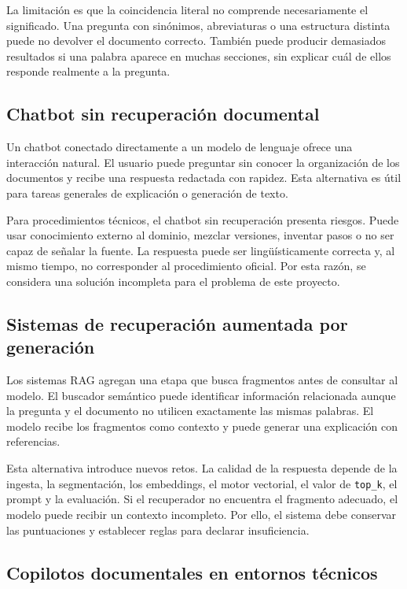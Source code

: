 La limitación es que la coincidencia literal no comprende necesariamente el significado. Una pregunta con sinónimos, abreviaturas o una estructura distinta puede no devolver el documento correcto. También puede producir demasiados resultados si una palabra aparece en muchas secciones, sin explicar cuál de ellos responde realmente a la pregunta.

\subsection{Chatbot sin recuperación documental}

Un chatbot conectado directamente a un modelo de lenguaje ofrece una interacción natural. El usuario puede preguntar sin conocer la organización de los documentos y recibe una respuesta redactada con rapidez. Esta alternativa es útil para tareas generales de explicación o generación de texto.

Para procedimientos técnicos, el chatbot sin recuperación presenta riesgos. Puede usar conocimiento externo al dominio, mezclar versiones, inventar pasos o no ser capaz de señalar la fuente. La respuesta puede ser lingüísticamente correcta y, al mismo tiempo, no corresponder al procedimiento oficial. Por esta razón, se considera una solución incompleta para el problema de este proyecto.

\subsection{Sistemas de recuperación aumentada por generación}

Los sistemas RAG agregan una etapa que busca fragmentos antes de consultar al modelo. El buscador semántico puede identificar información relacionada aunque la pregunta y el documento no utilicen exactamente las mismas palabras. El modelo recibe los fragmentos como contexto y puede generar una explicación con referencias.

Esta alternativa introduce nuevos retos. La calidad de la respuesta depende de la ingesta, la segmentación, los embeddings, el motor vectorial, el valor de \texttt{top\_k}, el prompt y la evaluación. Si el recuperador no encuentra el fragmento adecuado, el modelo puede recibir un contexto incompleto. Por ello, el sistema debe conservar las puntuaciones y establecer reglas para declarar insuficiencia.

\subsection{Copilotos documentales en entornos técnicos}

